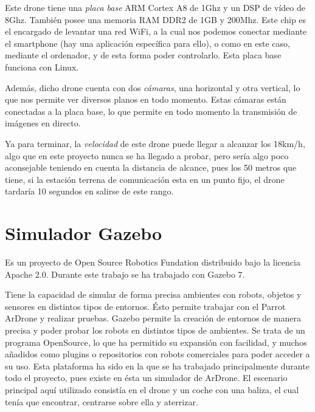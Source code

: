 \hspace{1 cm} Este drone tiene una \textsl{placa base} ARM Cortex A8 de 1Ghz y un DSP de v\'ideo de 8Ghz. Tambi\'en posee una memoria RAM DDR2 de 1GB y 200Mhz. Este chip es el encargado de levantar una red WiFi, a la cual nos podemos conectar mediante el smartphone (hay una aplicaci\'on espec\'ifica para ello), o como en este caso, mediante el ordenador, y de esta forma poder controlarlo. Esta placa base funciona con Linux. 

\hspace{1 cm} Adem\'as, dicho drone cuenta con dos \textsl{c\'amaras}, una horizontal y otra vertical, lo que nos permite ver diversos planos en todo momento. Estas c\'amaras est\'an conectadas a la placa base, lo que permite en todo momento la transmisi\'on de im\'agenes en directo.


\hspace{1 cm} Ya para terminar, la \textsl{velocidad} de este drone puede llegar a alcanzar los 18km/h, algo que en este proyecto nunca se ha llegado a probar, pero ser\'ia algo poco aconsejable teniendo en cuenta la distancia de alcance, pues los 50 metros que tiene, si la estaci\'on terrena de comunicaci\'on esta en un punto fijo, el drone tardar\'ia 10 segundos en salirse de este rango. 


\section{Simulador Gazebo }
\hspace{1 cm} Es un proyecto de Open Source Robotics Fundation distribuido bajo la licencia Apache 2.0. Durante este trabajo se ha trabajado con Gazebo 7. 

\hspace{1 cm}Tiene la capacidad de simular de forma precisa ambientes con robots, objetos y sensores en distintos tipos de entornos. \'Esto permite trabajar con el Parrot ArDrone y realizar pruebas. Gazebo permite la creaci\'on de entornos de manera precisa y poder probar los robots en distintos tipos de ambientes. Se trata de un programa OpenSource, lo que ha permitido su expansi\'on con facilidad, y muchos añadidos como plugins o repositorios con robots comerciales para poder acceder a su uso. Esta plataforma ha sido en la que se ha trabajado principalmente durante todo el proyecto, pues existe en \'esta un simulador de ArDrone. El escenario principal aqu\'i utilizado consist\'ia en el drone y un coche con una baliza, el cual ten\'ia que encontrar, centrarse sobre ella y aterrizar.


